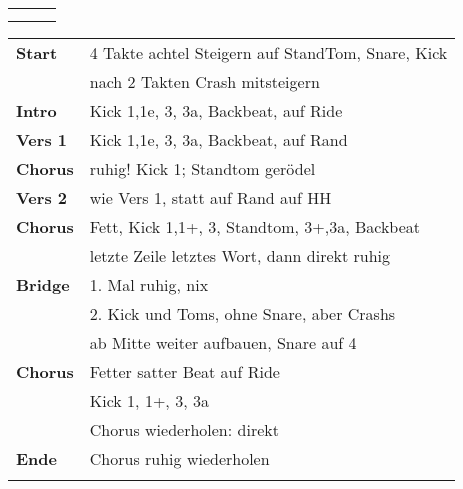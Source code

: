 

\begin{tabular}{p{0.6cm}p{12cm}p{1.4cm}}
	\rowcolor{cyan} \myRow{\thesongnumber} & \myRow{Die Leidenschaft} & \myRow{70} \\
	                                       &                          &            \\
\end{tabular}

\begin{tabular}{p{1.6cm}l}
	\textbf{Start}  & 4 Takte achtel Steigern auf StandTom, Snare, Kick \\
	                & nach 2 Takten Crash mitsteigern                   \\
	\textbf{Intro}  & Kick 1,1e, 3, 3a, Backbeat, \sechzehntel auf Ride \\
	\textbf{Vers 1} & Kick 1,1e, 3, 3a, Backbeat, \sechzehntel auf Rand \\
	\textbf{Chorus} & ruhig! Kick 1; Standtom gerödel                   \\
	\textbf{Vers 2} & wie Vers 1, statt auf Rand auf HH                 \\
	\textbf{Chorus} & Fett, Kick 1,1+, 3, Standtom, 3+,3a, Backbeat     \\
	                & letzte Zeile letztes Wort, dann direkt ruhig      \\
	\textbf{Bridge} & 1. Mal ruhig, nix                                 \\
	                & 2. Kick und Toms, ohne Snare, aber Crashs         \\
	                & ab Mitte weiter aufbauen, Snare auf 4             \\
	\textbf{Chorus} & Fetter satter Beat auf Ride                       \\
	                & Kick 1, 1+, 3, 3a                                 \\
	                & Chorus wiederholen: direkt                        \\
	\textbf{Ende}   & Chorus ruhig wiederholen                          \\
	                &                                                   \\
\end{tabular}

